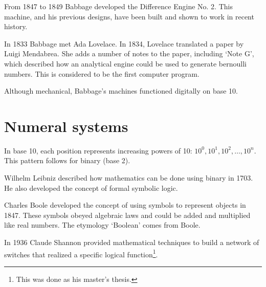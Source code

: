 From 1847 to 1849 Babbage developed the Difference Engine No. 2. This machine, and his previous designs, have been built and shown to work in recent history.

In 1833 Babbage met Ada Lovelace. In 1834, Lovelace translated a paper by Luigi Mendabrea. She adds a number of notes to the paper, including `Note G', which described how an analytical engine could be used to generate bernoulli numbers. This is considered to be the first computer program.

Although mechanical, Babbage's machines functioned digitally on base 10.

\section{Numeral systems}
In base 10, each position represents increasing powers of 10: \(10^0, 10^1, 10^2, \dots, 10^n\). This pattern follows for binary (base 2).

Wilhelm Leibniz described how mathematics can be done using binary in 1703. He also developed the concept of formal symbolic logic.

Charles Boole developed the concept of using symbols to represent objects in 1847. These symbols obeyed algebraic laws and could be added and multiplied like real numbers. The etymology `Boolean' comes from Boole.

In 1936 Claude Shannon provided mathematical techniques to build a network of switches that realized a specific logical function\footnote{This was done as his master's thesis.}.
